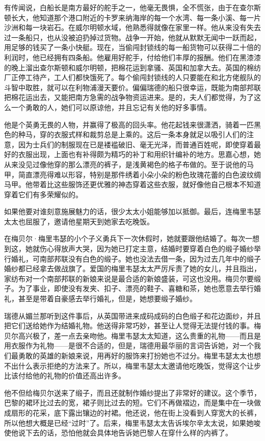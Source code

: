 \par 有传闻说，白船长是南方最好的舵手之一，他毫无畏惧，全不慌张，由于在查尔斯顿长大，他知道那个港口附近的卡罗来纳海岸的每一个水湾、每一条小溪、每一片沙洲和每一块岩石。在威尔明顿水域，他熟悉得就像在家里一样。他从来没有失去过一条船只，也从没被迫扔掉过货物。战争一开始，他就从默默无闻中一跃而起，用足够的钱买了一条小快艇。现在，当偷闯封锁线的每一船货物可以获得二十倍的利润时，他已经拥有四条船。他雇用好舵手，付给他们丰厚的报酬。他们在黑漆漆的晚上溜出查尔斯顿和威尔明顿，把棉花运到拿骚、英国和加拿大去。英国的棉纺厂正停工待产，工人们都快饿死了。每个偷闯封锁线的人只要能在和北方佬舰队的斗智中取胜，就可以在利物浦漫天要价。偏偏瑞德的船只很幸运，既能为南部邦联把棉花运出去，又能把南方急需的战争物资运进来。是的，夫人们都觉得，为了这么一个勇敢的人，她们可以原谅他，并且忘记有关他的好多事情。
\par 他是个英勇无畏的人物，并赢得了极高的回头率。他花起钱来很潇洒，骑着一匹黑色的种马，穿的衣服式样和裁剪总是上乘的。这后一条本身就足以吸引人们的注意，因为士兵们的制服现在已是褛褴破旧、毫无光泽，而普通百姓呢，即使穿着最好的衣服出现，上面也有补得颇为精巧的补丁和用织针编补的地方。思嘉心想，她从来没见过像他穿的那么漂亮的裤子，是浅黄褐色的格子布做的。至于说他的马甲，简直漂亮得难以形容，特别是那件绣着小朵小朵的粉色玫瑰花蕾的白色波纹绸马甲。他带着比这些服饰还更优雅的神态穿着这些衣服，就好像他自己根本不知道穿着它们有多荣耀似的。
\par 如果他要对谁刻意施展魅力的话，很少太太小姐能够加以抵御。最后，连梅里韦瑟太太也屈服了，邀请他星期天到她家去吃晚饭。
\par 在梅贝尔·梅里韦瑟的小个子义勇兵下一次休假时，她就要跟他结婚了。每次一想到这，她就伤心得放声大哭，因为她已打定主意，结婚时要穿着白色的缎子婚纱举行婚礼，可南部邦联没有白色的缎子。她也没法去借一条，因为过去几年中的缎子婚纱都已经拿去做战旗了。爱国的梅里韦瑟太太严厉斥责了她的女儿，并且指出，家纺布对一个南部邦联的新娘来说是最合适的新娘盛装，可这也没用。梅贝尔要缎子。为了事业，即使没有发夹、扣子、漂亮的鞋子、喜糖和茶，她也愿意去举行婚礼，甚至是带着自豪感去举行婚礼，但是，她想要缎子婚纱。
\par 瑞德从媚兰那听到这件事后，从英国带进来成码成码的白色缎子和花边面纱，并且把它们送给她作为结婚礼物。他送得非常巧妙，甚至让人觉得无法提付钱的事。梅贝尔高兴极了，差一点去亲吻他。梅里韦瑟太太知道，这么贵重的礼物——而且是用衣服作为礼物——是很不合适的，但是，瑞德用最华丽的言词告诉她，对一个我们最勇敢的英雄的新娘来说，用再好的服饰来打扮她也不过分。梅里韦瑟太太也想不出什么表示拒绝的方法来了。所以，梅里韦瑟太太邀请他吃晚饭，觉得这个让步比该付给他的礼物的价值还高出许多。
\par 他不但给梅贝尔送来了缎子，而且还就制作婚纱提出了非常好的建议。这个季节，巴黎的裙环比过去的宽，裙子则比过去的短。它们不再做褶边，而是集中在一块做成扇形的花采，底下露出镶边的衬裙。他还说，他在街上没看到人穿宽大的长裤，所以他想大概是已经“过时”了。后来，梅里韦瑟太太告诉埃尔辛太太说，如果她唆使他说下去的话，恐怕他就会具体地告诉她巴黎人在穿什么样的内裤了。
